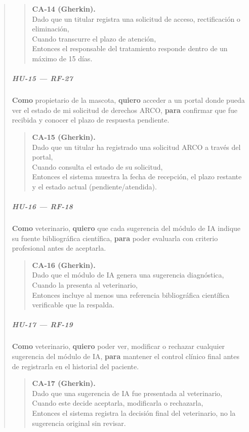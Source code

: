 \documentclass[
]{article}
\begin{document}
\begin{quote}
\begin{quote}
\textbf{CA-14 (Gherkin).} \\
Dado que un titular registra una solicitud de acceso, rectificación o eliminación, \\
Cuando transcurre el plazo de atención, \\
Entonces el responsable del tratamiento responde dentro de un máximo de 15 días.
\end{quote}

\subparagraph{HU-15 --- RF-27}
\textbf{Como} propietario de la mascota,
\textbf{quiero} acceder a un portal donde pueda ver el estado de mi solicitud de derechos ARCO,
\textbf{para} confirmar que fue recibida y conocer el plazo de respuesta pendiente.

\begin{quote}
\textbf{CA-15 (Gherkin).} \\
Dado que un titular ha registrado una solicitud ARCO a través del portal, \\
Cuando consulta el estado de su solicitud, \\
Entonces el sistema muestra la fecha de recepción, el plazo restante y el estado actual (pendiente/atendida).
\end{quote}

\subparagraph{HU-16 --- RF-18}
\textbf{Como} veterinario,
\textbf{quiero} que cada sugerencia del módulo de IA indique su fuente bibliográfica científica,
\textbf{para} poder evaluarla con criterio profesional antes de aceptarla.

\begin{quote}
\textbf{CA-16 (Gherkin).} \\
Dado que el módulo de IA genera una sugerencia diagnóstica, \\
Cuando la presenta al veterinario, \\
Entonces incluye al menos una referencia bibliográfica científica verificable que la respalda.
\end{quote}

\subparagraph{HU-17 --- RF-19}
\textbf{Como} veterinario,
\textbf{quiero} poder ver, modificar o rechazar cualquier sugerencia del módulo de IA,
\textbf{para} mantener el control clínico final antes de registrarla en el historial del paciente.

\begin{quote}
\textbf{CA-17 (Gherkin).} \\
Dado que una sugerencia de IA fue presentada al veterinario, \\
Cuando este decide aceptarla, modificarla o rechazarla, \\
Entonces el sistema registra la decisión final del veterinario, no la sugerencia original sin revisar.
\end{quote}


\end{quote}
\end{document}
